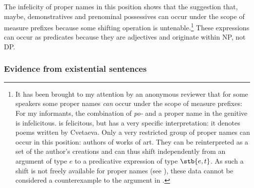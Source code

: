 \documentclass[output=paper,
colorlinks,
citecolor=brown,
newtxmath
]{langscibook}
\begin{document}

\ea\label{nasmotret} 
\z\z 

\noindent The infelicity of proper names in this position shows that the suggestion that, maybe, demonstratives and prenominal possessives can occur under the scope of measure prefixes because some shifting operation is untenable.\footnote{It has been brought to my attention by an anonymous reviewer that for some speakers some proper names \emph{can} occur under the scope of measure prefixes:
\ea
\z\z 
\noindent For my informants, the combination of \textit{po-} and a proper name in the genitive is infelicitous.  is felicitous, but has a very specific interpretation: it denotes poems written by Cvetaeva. Only a very restricted group of proper names can occur in this position: authors of works of art. They can be reinterpreted as a set of the author's creations and can thus shift independently from an argument of type $e$ to a predicative expression of type $\stb{e,t}$. As such a shift is not freely available for proper names (see ), these data cannot be considered a counterexample to the argument in .
}
These expressions can occur as predicates because they are adjectives and originate within NP, not DP.


\subsubsection{Evidence from existential sentences}
\end{document}
